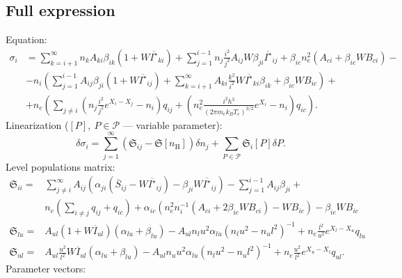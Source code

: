 \documentclass{article}
\begin{document}
\subsection{Full expression}
Equation:
\begin{equation}
    \begin{aligned}
        \sigma_i &= \sum\limits_{k=i+1}^\infty n_kA_{ki}\beta_{ik}(1 + W\overline{I^\star}_{ki}) + \sum\limits_{j=1}^{i-1} n_j\frac{i^2}{j^2}A_{ij}W\beta_{ji} \overline{I^\star}_{ij} +\beta_{ic}n_e^2(A_{ci} + \beta_{ic}WB_{ci}) -\\
        &-n_i\left(\sum\limits_{j=1}^{i-1}A_{ij}\beta_{ji}(1 + W\overline{I^\star}_{ij}) + \sum\limits_{k=i+1}^\infty A_{ki}\frac{k^2}{i^2}W\overline{I^\star}_{ki}\beta_{ik}  + \beta_{ic}WB_{ic}\right) +\\
        &+n_e\left(\sum\limits_{j \neq i}\left(n_j\frac{i^2}{j^2}e^{X_i-X_j}-n_i\right)q_{ij}  + \left(n_e^2\frac{i^2h^3}{(2\pi m_ek_BT_e)^{3/2}}e^{X_i}-n_i\right)q_{ic}\right). 
    \end{aligned}
\end{equation}
Linearization (\([P],\ P \in \mathcal{P}\) --- variable parameter):
\[
    \delta\sigma_i = \sum\limits_{j = 1}^\infty  \left(\mathfrak{S}_{ij}-\mathfrak{S}[n_\mathrm{H}]\right)\delta n_j + \sum\limits_{P \in \mathcal{P}}\mathfrak{S}_i[P]\delta{P}.
\]
Level populations matrix:
\begin{equation}
    \begin{aligned}
        \mathfrak{S}_{ii} =& \sum\limits_{j \neq i}^{\infty} A_{ij}\left(\alpha_{ji}(\overline{S}_{ij} - W\overline{I^\star}_{ij}) -\beta_{ji}W\overline{I^\star}_{ij}\right) - \sum\limits_{j=1}^{i-1}A_{ij}\beta_{ji} + \\
        &n_e\left(\sum\limits_{i \neq j}q_{ij} + q_{ic}\right) + \alpha_{ic}(n_e^2n_i^{-1}(A_{ci} + 2\beta_{ic}WB_{ci}) - WB_{ic}) - \beta_{ic}WB_{ic}\\
        \mathfrak{S}_{lu} =& A_{ul}(1 + W\overline{I}_{ul})(\alpha_{lu} + \beta_{lu}) - A_{ul}n_lu^2\alpha_{lu}(n_lu^2 - n_ul^2)^{-1} + n_e\frac{l^2}{u^2}e^{X_l-X_u}q_{lu}\\
        \mathfrak{S}_{ul} =& A_{ul}\frac{u^2}{l^2}W\overline{I}_{ul}(\alpha_{lu}  + \beta_{lu}) - A_{ul}n_uu^2\alpha_{lu}(n_lu^2 - n_ul^2)^{-1} + n_e \frac{u^2}{l^2}e^{X_u-X_l}q_{ul}.
    \end{aligned}
\end{equation}
Parameter vectors:
\end{document}
